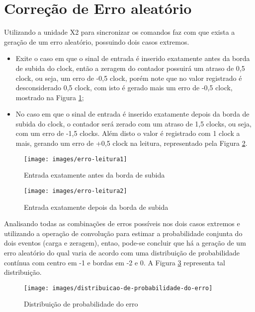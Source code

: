 \documentclass[12pt,a4paper,openany]{abntex2}
\begin{document}
\section{Correção de Erro aleatório}

Utilizando a unidade X2 para sincronizar os comandos faz com que exista a geração de um erro aleatório, possuindo dois casos extremos.

\begin{itemize}	
	\item Exite o caso em que o sinal de entrada é inserido exatamente antes da borda de subida do clock, então a zeragem do contador possuirá um atraso de 0,5 clock, ou seja, um erro de -0,5 clock, porém note que no valor registrado é desconsiderado 0,5 clock, com isto é gerado mais um erro de -0,5 clock, mostrado na Figura \ref{fig:erro-leitura1};
\end{itemize}


\begin{itemize}	
	\item No caso em que o sinal de entrada é inserido exatamente depois da borda de subida do clock, o contador será zerado com um atraso de 1,5 clocks, ou seja, com um erro de -1,5 clocks. Além disto o valor é registrado com 1 clock a mais, gerando um erro de +0,5 clock na leitura, representado pela Figura \ref{fig:erro-leitura2}.
\end{itemize}

\begin{figure}[!htp]
	\centering
	\caption{Entrada exatamente antes da borda de subida}
	\texttt{[image: images/erro-leitura1]}
	\label{fig:erro-leitura1}
\end{figure}

\begin{figure}[!htp]
	\centering
	\caption{Entrada exatamente depois da borda de subida}
	\texttt{[image: images/erro-leitura2]}
	\label{fig:erro-leitura2}
\end{figure}

Analisando todas as combinações de erros possíveis nos dois casos extremos e utilizando a operação de convolução para estimar a probabilidade conjunta do dois eventos (carga e zeragem), entao, pode-se concluir que há a geração de um erro aleatório do qual varia de acordo com uma distribuição de probabilidade contínua com centro em -1 e bordas em -2 e 0. A Figura \ref{fig:distribuicao-de-probabilidade-do-erro} representa tal distribuição.

\begin{figure}[!htp]
	\centering
	\caption{Distribuição de probabilidade do erro}
	\texttt{[image: images/distribuicao-de-probabilidade-do-erro]}
	\label{fig:distribuicao-de-probabilidade-do-erro}
\end{figure}
\end{document}
